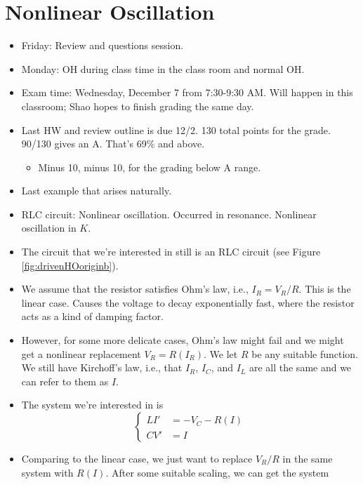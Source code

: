\documentclass[../notes.tex]{subfiles}
\begin{document}
\section{Nonlinear Oscillation}
\begin{itemize}
    \item {}Friday: Review and questions session.
    \item Monday: OH during class time in the class room and normal OH.
    \item Exam time: Wednesday, December 7 from 7:30-9:30 AM. Will happen in this classroom; Shao hopes to finish grading the same day.
    \item Last HW and review outline is due 12/2. 130 total points for the grade. 90/130 gives an A. That's 69\% and above.
    \begin{itemize}
        \item Minus 10, minus 10, for the grading below A range.
    \end{itemize}
    \item Last example that arises naturally.
    \item RLC circuit: Nonlinear oscillation. Occurred in resonance. Nonlinear oscillation in $K$.
    \item The circuit that we're interested in still is an RLC circuit (see Figure \ref{fig:drivenHOoriginb}).
    \item We assume that the resistor satisfies Ohm's law, i.e., $I_R=V_R/R$. This is the linear case. Causes the voltage to decay exponentially fast, where the resistor acts as a kind of damping factor.
    \item However, for some more delicate cases, Ohm's law might fail and we might get a nonlinear replacement $V_R=R(I_R)$. We let $R$ be any suitable function. We still have Kirchoff's law, i.e., that $I_R$, $I_C$, and $I_L$ are all the same and we can refer to them as $I$.
    \item The system we're interested in is
    \begin{equation*}
        \begin{cases}
            LI' &= -V_C-R(I)\\
            CV' &= I
        \end{cases}
    \end{equation*}
    \item Comparing to the linear case, we just want to replace $V_R/R$ in the same system with $R(I)$. After some suitable scaling, we can get the system
    \begin{equation*}

\end{equation*}
\end{itemize}
\end{document}
